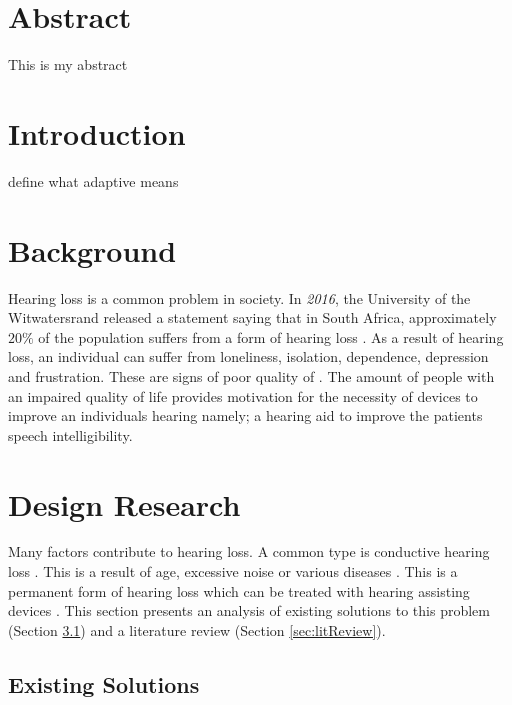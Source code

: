 \documentclass[11pt,onecolumn]{witseiepaper}
\begin{document}
\tableofcontents
\newpage

\section*{Abstract}

This is my abstract

\section{Introduction}

define what adaptive means

\section{Background}

\noindent Hearing loss is a common problem in society. In \textit{2016}, the University of the Witwatersrand released a statement saying that in South Africa, approximately $20\%$ of the population suffers from a form of hearing loss \cite{witsHearingStats}. As a result of hearing loss, an individual can suffer from loneliness, isolation, dependence, depression and frustration. These are signs of poor quality of \cite{qualityOfLife}. The amount of people with an impaired quality of life provides motivation for the necessity of devices to improve an individuals hearing namely; a hearing aid to improve the patients speech intelligibility. 


\section{Design Research}

\noindent Many factors contribute to hearing loss. A common type is conductive hearing loss \cite{earinfo}. This is a result of age, excessive noise or various diseases \cite{hearIt}. This is a permanent form of hearing loss which can be treated with hearing assisting devices \cite{hearIt}. This section presents an analysis of existing solutions to this problem (Section \ref{sec:existSoln}) and a literature review (Section \ref{sec:litReview}).

\subsection{Existing Solutions}
\label{sec:existSoln}
\end{document}
